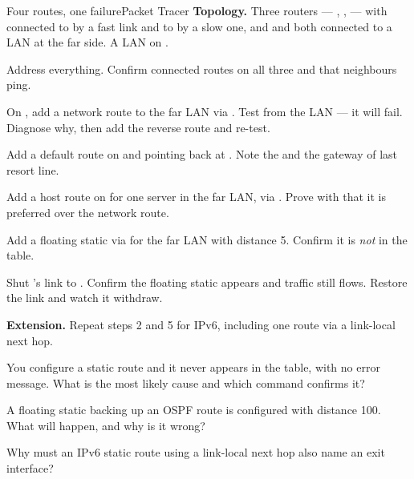 \begin{lab}{Four routes, one failure}{Packet Tracer}
\textbf{Topology.} Three routers --- , ,  --- with
 connected to  by a fast link and to  by a slow one, and
 and  both connected to a LAN at the far side. A LAN on .

\begin{tasks}
  \item Address everything. Confirm connected routes on all three and that
        neighbours ping.
  \item On , add a network route to the far LAN via . Test from
        the  LAN --- it will fail. Diagnose why, then add the reverse
        route and re-test.
  \item Add a default route on  and  pointing back at .
        Note the  and the gateway of last resort line.
  \item Add a host route on  for one server in the far LAN, via
        . Prove with  that it is preferred
        over the network route.
  \item Add a floating static via  for the far LAN with distance 5.
        Confirm it is \emph{not} in the table.
  \item Shut 's link to . Confirm the floating static appears and
        traffic still flows. Restore the link and watch it withdraw.
  \item \textbf{Extension.} Repeat steps 2 and 5 for IPv6, including one route via
        a link-local next hop.
\end{tasks}
\end{lab}

\begin{checkpoint}
\begin{tightnum}
  \item You configure a static route and it never appears in the table, with no
        error message. What is the most likely cause and which command confirms
        it?
  \item A floating static backing up an OSPF route is configured with distance
        100. What will happen, and why is it wrong?
  \item Why must an IPv6 static route using a link-local next hop also name an
        exit interface?
\end{tightnum}
\end{checkpoint}

